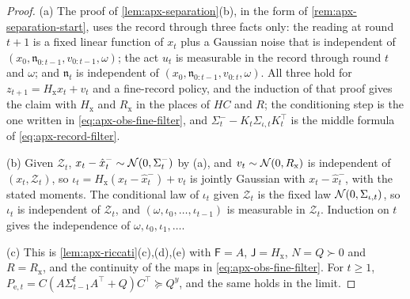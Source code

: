 \begin{proof}
(a) The proof of \cref{lem:apx-separation}(b), in the form of \cref{rem:apx-separation-start}, uses the record through three facts only: the reading at round $t+1$ is a fixed linear function of $x_t$ plus a Gaussian noise that is independent of $(x_0,\mathfrak n_{0:t-1},v_{0:t-1},\omega)$; the act $u_t$ is measurable in the record through round $t$ and $\omega$; and $\mathfrak n_t$ is independent of $(x_0,\mathfrak n_{0:t-1},v_{0:t},\omega)$. All three hold for $z_{t+1}=H_{\mathrm x}x_t+v_t$ and a fine-record policy, and the induction of that proof gives the claim with $H_{\mathrm x}$ and $R_{\mathrm x}$ in the places of $HC$ and $R$; the conditioning step is the one written in \eqref{eq:apx-obs-fine-filter}, and $\Sigma^-_t-K_t\Sigma_{\iota,t}K_t^\top$ is the middle formula of \cref{eq:apx-record-filter}.

(b) Given $\mathcal Z_t$, $x_t-\hat x^-_t\sim\mathcal{N}(0,\Sigma^-_t)$ by (a), and $v_t\sim\mathcal{N}(0,R_{\mathrm x})$ is independent of $(x_t,\mathcal Z_t)$, so $\iota_t=H_{\mathrm x}(x_t-\hat x^-_t)+v_t$ is jointly Gaussian with $x_t-\hat x^-_t$, with the stated moments. The conditional law of $\iota_t$ given $\mathcal Z_t$ is the fixed law $\mathcal{N}(0,\Sigma_{\iota,t})$, so $\iota_t$ is independent of $\mathcal Z_t$, and $(\omega,\iota_0,\dots,\iota_{t-1})$ is measurable in $\mathcal Z_t$. Induction on $t$ gives the independence of $\omega,\iota_0,\iota_1,\dots$.

(c) This is \cref{lem:apx-riccati}(c),(d),(e) with $\mathsf F=A$, $\mathsf J=H_{\mathrm x}$, $N=Q\succ0$ and $R=R_{\mathrm x}$, and the continuity of the maps in \eqref{eq:apx-obs-fine-filter}. For $t\ge1$, $P_{\mathrm e,t}=C(A\Sigma^{\mathrm f}_{t-1}A^\top+Q)C^\top\succeq Q^y$, and the same holds in the limit.
\end{proof}

